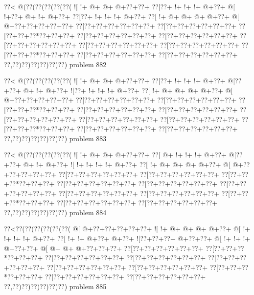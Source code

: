 \vbox{\vbox{\goo
\0??<\- @(\0??(\0??(\0??(\0??(\0??(
\- ![\- !+\- @+\- @+\- @+\0??+\0??+
\0??[\0??+\- !+\- !+\- !+\- @+\0??+
\- @[\- !+\0??+\- @+\- !+\- @+\0??+
\0??[\0??+\- !+\- !+\- !+\- @+\0??+
\0??[\- !+\- @+\- @+\- @+\- @+\0??+
\- @[\- @+\0??+\0??+\0??+\0??+\0??+
\0??[\0??+\0??+\0??+\0??+\0??+\0??+
\0??[\0??+\0??+\0??+\0??+\0??+\0??+
\0??[\0??+\0??+\0??*\0??+\0??+\0??+
\0??[\0??+\0??+\0??+\0??+\0??+\0??+
\0??[\0??+\0??+\0??+\0??+\0??+\0??+
\0??[\0??+\0??+\0??+\0??+\0??+\0??+
\0??[\0??+\0??+\0??+\0??+\0??+\0??+
\0??[\0??+\0??+\0??+\0??+\0??+\0??+
\0??[\0??+\0??+\0??*\0??+\0??+\0??+
\0??[\0??+\0??+\0??+\0??+\0??+\0??+
\0??[\0??+\0??+\0??+\0??+\0??+\0??+
\0??,\0??)\0??)\0??)\0??)\0??)\0??)
}
\hfil problem 882\hfil\break
}

\vbox{\vbox{\goo
\0??<\- @(\0??(\0??(\0??(\0??(\0??(
\- ![\- !+\- @+\- @+\- @+\0??+\0??+
\0??[\0??+\- !+\- !+\- !+\- @+\0??+
\- @[\0??+\0??+\- @+\- !+\- @+\0??+
\- ![\0??+\- !+\- !+\- !+\- @+\0??+
\0??[\- !+\- @+\- @+\- @+\- @+\0??+
\- @[\- @+\0??+\0??+\0??+\0??+\0??+
\0??[\0??+\0??+\0??+\0??+\0??+\0??+
\0??[\0??+\0??+\0??+\0??+\0??+\0??+
\0??[\0??+\0??+\0??*\0??+\0??+\0??+
\0??[\0??+\0??+\0??+\0??+\0??+\0??+
\0??[\0??+\0??+\0??+\0??+\0??+\0??+
\0??[\0??+\0??+\0??+\0??+\0??+\0??+
\0??[\0??+\0??+\0??+\0??+\0??+\0??+
\0??[\0??+\0??+\0??+\0??+\0??+\0??+
\0??[\0??+\0??+\0??*\0??+\0??+\0??+
\0??[\0??+\0??+\0??+\0??+\0??+\0??+
\0??[\0??+\0??+\0??+\0??+\0??+\0??+
\0??,\0??)\0??)\0??)\0??)\0??)\0??)
}
\hfil problem 883\hfil\break
}

\vbox{\vbox{\goo
\0??<\- @(\0??(\0??(\0??(\0??(\0??(
\- ![\- !+\- @+\- @+\- @+\0??+\0??+
\0??[\- @+\- !+\- !+\- !+\- @+\0??+
\- @[\0??+\0??+\- @+\- !+\- @+\0??+
\- ![\- !+\- !+\- !+\- !+\- @+\0??+
\0??[\- !+\- @+\- @+\- @+\- @+\0??+
\- @[\- @+\0??+\0??+\0??+\0??+\0??+
\0??[\0??+\0??+\0??+\0??+\0??+\0??+
\0??[\0??+\0??+\0??+\0??+\0??+\0??+
\0??[\0??+\0??+\0??*\0??+\0??+\0??+
\0??[\0??+\0??+\0??+\0??+\0??+\0??+
\0??[\0??+\0??+\0??+\0??+\0??+\0??+
\0??[\0??+\0??+\0??+\0??+\0??+\0??+
\0??[\0??+\0??+\0??+\0??+\0??+\0??+
\0??[\0??+\0??+\0??+\0??+\0??+\0??+
\0??[\0??+\0??+\0??*\0??+\0??+\0??+
\0??[\0??+\0??+\0??+\0??+\0??+\0??+
\0??[\0??+\0??+\0??+\0??+\0??+\0??+
\0??,\0??)\0??)\0??)\0??)\0??)\0??)
}
\hfil problem 884\hfil\break
}

\vbox{\vbox{\goo
\0??<\0??(\0??(\0??(\0??(\0??(\0??(
\- @[\- @+\0??+\0??+\0??+\0??+\0??+
\- ![\- !+\- @+\- @+\- @+\- @+\0??+
\- @[\- !+\- !+\- !+\- !+\- @+\0??+
\0??[\- !+\- !+\- @+\0??+\- @+\0??+
\- ![\0??+\0??+\0??+\- @+\0??+\0??+
\- @[\- !+\- !+\- !+\- @+\0??+\0??+
\- @[\- @+\- @+\- @+\0??+\0??+\0??+
\0??[\0??+\0??+\0??+\0??+\0??+\0??+
\0??[\0??+\0??+\0??*\0??+\0??+\0??+
\0??[\0??+\0??+\0??+\0??+\0??+\0??+
\0??[\0??+\0??+\0??+\0??+\0??+\0??+
\0??[\0??+\0??+\0??+\0??+\0??+\0??+
\0??[\0??+\0??+\0??+\0??+\0??+\0??+
\0??[\0??+\0??+\0??+\0??+\0??+\0??+
\0??[\0??+\0??+\0??*\0??+\0??+\0??+
\0??[\0??+\0??+\0??+\0??+\0??+\0??+
\0??[\0??+\0??+\0??+\0??+\0??+\0??+
\0??,\0??)\0??)\0??)\0??)\0??)\0??)
}
\hfil problem 885\hfil\break
}

